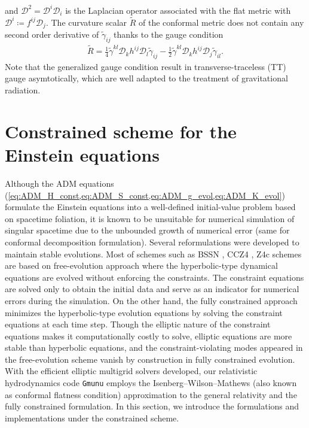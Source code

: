 and $\mathcal{D}^2 = \mathcal{D}^i \mathcal{D}_i$ is the Laplacian operator associated with the flat metric with $\mathcal{D}^i \coloneqq f^{ij}\mathcal{D}_j$.
The curvature scalar $\tilde{R}$ of the conformal metric does not contain any second order derivative of $\tilde{\gamma}_{ij}$ thanks to the gauge condition
\begin{align}
    \tilde{R} = \frac{1}{4} \tilde{\gamma}^{kl} \mathcal{D}_k h^{ij} \mathcal{D}_l \tilde{\gamma}_{ij} 
    - \frac{1}{2} \tilde{\gamma}^{kl} \mathcal{D}_k h^{ij} \mathcal{D}_j \tilde{\gamma}_{il}.
\end{align}
Note that the generalized gauge condition result in transverse-traceless (TT) gauge asymtotically,
which are well adapted to the treatment of gravitational radiation.

\section{Constrained scheme for the Einstein equations}  %
\label{section1.5}
Although the ADM equations (\cref{eq:ADM_H_const,eq:ADM_S_const,eq:ADM_g_evol,eq:ADM_K_evol}) formulate the Einstein equations into a well-defined initial-value problem based on spacetime foliation,
it is known to be unsuitable for numerical simulation of singular spacetime due to the unbounded growth of numerical error (same for conformal decomposition formulation).
Several reformulations were developed to maintain stable evolutions.
Most of schemes such as BSSN \cite{shibata1995evolution,baumgarte1998numerical}, CCZ4 \cite{bona2003general}, Z4c \cite{bernuzzi2010constraint} schemes are based on free-evolution approach where the hyperbolic-type dynamical equations are evolved without enforcing the constraints.
The constraint equations are solved only to obtain the initial data and serve as an indicator for numerical errors during the simulation.
On the other hand, the fully constrained approach minimizes the hyperbolic-type evolution equations by solving the constraint equations at each time step.
Though the elliptic nature of the constraint equations makes it computationally costly to solve,
elliptic equations are more stable than hyperbolic equations,
and the constraint-violating modes appeared in the free-evolution scheme vanish by construction in fully constrained evolution.\\
With the efficient elliptic multigrid solvers developed,
our relativistic hydrodynamics code \texttt{Gmunu} employs the Isenberg–Wilson–Mathews (also known as conformal flatness condition) approximation to the general relativity
and the fully constrained formulation.
In this section, we introduce the formulations and implementations under the constrained scheme.

